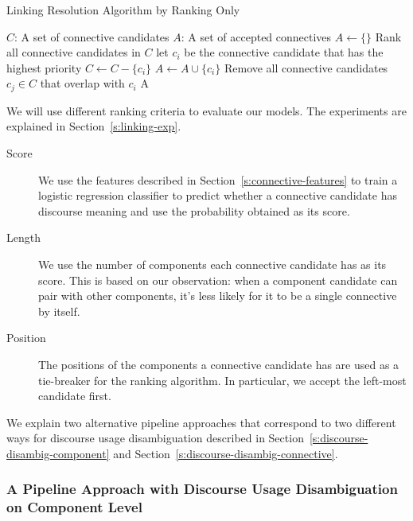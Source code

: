 \begin{algorithm}
    \caption{Linking Resolution Algorithm by Ranking Only}
    \label{a:linking-rank}
    \begin{algorithmic}[1]
        \Require
            $C$: A set of connective candidates
        \Ensure
            $A$: A set of accepted connectives
        \State $A \gets \{\}$
        \State Rank all connective candidates in $ C $
            \State let $ c_i $ be the connective candidate that has the highest priority
            \State $C \gets C - \{c_i\}$
            \State $A \gets A \cup \{c_i\}$
            \State Remove all connective candidates $ c_j \in C $ that overlap with $ c_i $
        \EndWhile
        \State \Return A
    \end{algorithmic}
\end{algorithm}

We will use different ranking criteria to evaluate our models. The experiments are
explained in Section~\ref{s:linking-exp}.

\begin{description}
\item[Score] We use the features described in Section~\ref{s:connective-features} to
    train a logistic regression classifier to predict whether a connective candidate
    has discourse meaning and use the probability obtained as its score.

\item[Length] We use the number of components each connective candidate has as its
    score. This is based on our observation: when a component candidate can
    pair with other components, it's less likely for it to be a single connective by
    itself.

\item[Position] The positions of the components a connective candidate has are used
    as a tie-breaker for the ranking algorithm. In particular, we accept the left-most
    candidate first.
\end{description}

We explain two alternative pipeline approaches that correspond to
two different ways for discourse usage disambiguation described
in Section~\ref{s:discourse-disambig-component} and
Section~\ref{s:discourse-disambig-connective}.

\subsubsection{A Pipeline Approach with Discourse Usage Disambiguation on Component Level}
\label{s:pipeline1}

